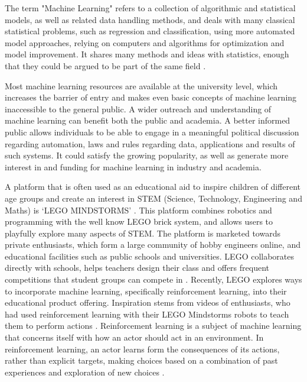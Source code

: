 \documentclass[11pt, a4paper]{article}
\begin{document}
	\medskip
	
	The term "Machine Learning" refers to a collection of algorithmic and statistical models, as well as related data handling methods, and deals with many classical statistical problems, such as regression and classification, using more automated model approaches, relying on computers and algorithms for optimization and model improvement. It shares many methods and ideas with statistics, enough that they could be argued to be part of the same field \cite{jordan}.
	
	\medskip
	
	Most machine learning resources are available at the university level, which increases the barrier of entry and makes even basic concepts of machine learning inaccessible to the general public. A wider outreach and understanding of machine learning can benefit both the public and academia. A better informed public allows individuals to be able to engage in a meaningful political discussion regarding automation, laws and rules regarding data, applications and results of such systems. It could satisfy the growing popularity, as well as generate more interest in and funding for machine learning in industry and academia. 
	\medskip
	
	A platform that is often used as an educational aid to inspire children of different age groups and create an interest in STEM (Science, Technology, Engineering and Maths) is `LEGO MINDSTORMS' \cite{LEGOeducation}. This platform combines robotics and programming with the well know LEGO brick system, and allows users to playfully explore many aspects of STEM. The platform is marketed towards private enthusiasts, which form a large community of hobby engineers online, and educational facilities such as public schools and universities. LEGO collaborates directly with schools, helps teachers design their class and offers frequent competitions that student groups can compete in \cite{naerheden}. Recently, LEGO explores ways to incorporate machine learning, specifically reinforcement learning, into their educational product offering. Inspiration stems from videos of enthusiasts, who had used reinforcement learning with their LEGO Mindstorms robots to teach them to perform actions \cite{youtube_crawl}\cite{youtube_swing}. Reinforcement learning is a subject of machine learning that concerns itself with how an actor should act in an environment. In reinforcement learning, an actor learns form the consequences of its actions, rather than explicit targets, making choices based on a combination of past experiences and exploration of new choices \cite{woergoetter_porr}.
	
\end{document}
